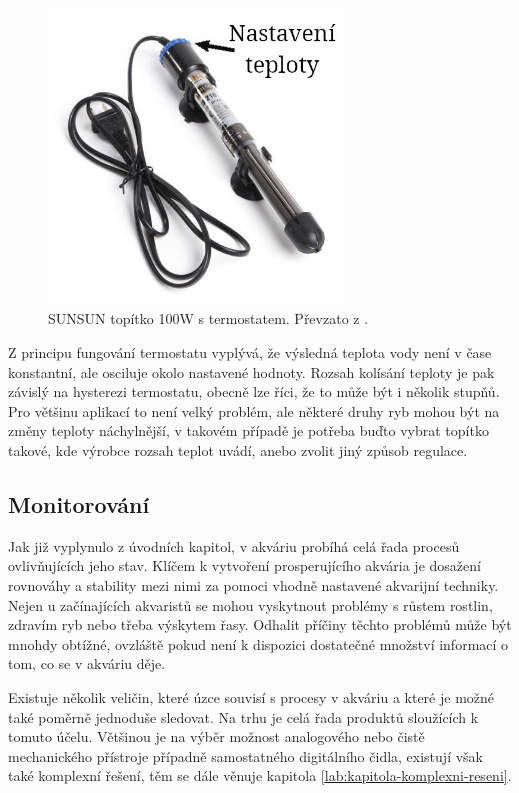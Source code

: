         \begin{figure}[h!]
            \centering
            \includegraphics[width=0.7\textwidth]{obrazky/topeni/topitko.jpg}
            \caption{SUNSUN topítko 100W s termostatem. Převzato z \cite{eshop-rostlinna-akvaria}.}
            \label{fig:obrazky-topeni-topitko-jpg}
        \end{figure}
        
        Z principu fungování termostatu vyplývá, že výsledná teplota vody není v čase konstantní, ale osciluje okolo nastavené hodnoty. Rozsah kolísání teploty je pak závislý na hysterezi termostatu, obecně lze říci, že to může být i několik stupňů. Pro většinu aplikací to není velký problém, ale některé druhy ryb mohou být na změny teploty náchylnější, v takovém případě je potřeba buďto vybrat topítko takové, kde výrobce rozsah teplot uvádí, anebo zvolit jiný způsob regulace. 

    \subsection{Monitorování}
        Jak již vyplynulo z úvodních kapitol, v akváriu probíhá celá řada procesů ovlivňujících jeho stav. Klíčem k vytvoření prosperujícího akvária je dosažení rovnováhy a stability mezi nimi za pomoci vhodně nastavené akvarijní techniky. Nejen u začínajících akvaristů se mohou vyskytnout problémy s růstem rostlin, zdravím ryb nebo třeba výskytem řasy. Odhalit příčiny těchto problémů může být mnohdy obtížné, ovzláště pokud není k dispozici dostatečné množství informací o tom, co se v akváriu děje. 
        
        Existuje několik veličin, které úzce souvisí s procesy v akváriu a které je možné také poměrně jednoduše sledovat. Na trhu je celá řada produktů sloužících k tomuto účelu. Většinou je na výběr možnost analogového nebo čistě mechanického přístroje případně samostatného digitálního čidla, existují však také komplexní řešení, těm se dále věnuje kapitola  \ref{lab:kapitola-komplexni-reseni}. 

